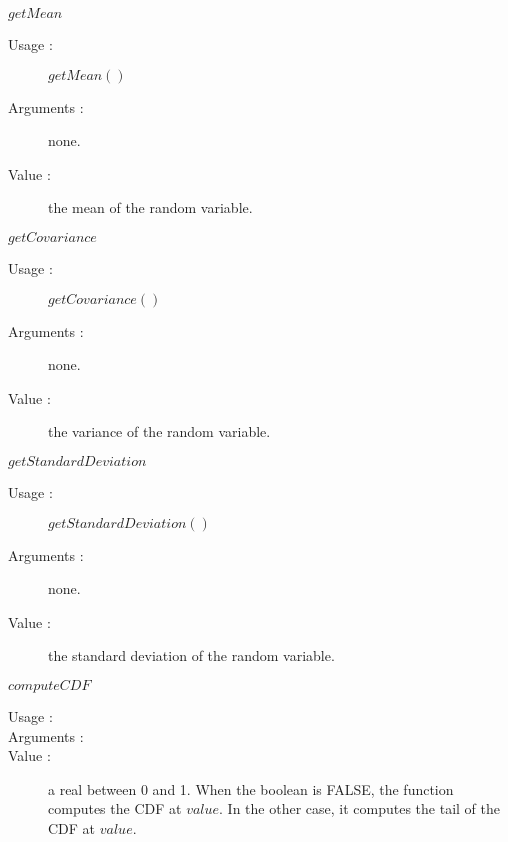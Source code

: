 \begin{description}
\begin{description}
  \item $getMean$
    \begin{description}
    \item[Usage :] $getMean()$
    \item[Arguments :]  none.
    \item[Value :]  the mean of the random variable.
    \end{description}
    \bigskip


  \item $getCovariance$
    \begin{description}
    \item[Usage :] $getCovariance()$
    \item[Arguments :]  none.
    \item[Value :]  the variance of the random variable.
    \end{description}
    \bigskip


  \item $getStandardDeviation$
    \begin{description}
    \item[Usage :] $getStandardDeviation()$
    \item[Arguments :]  none.
    \item[Value :]  the standard deviation of the random variable.
    \end{description}
    \bigskip
 

  \item $computeCDF$
    \begin{description}
    \item[Usage :] \strut
    \item[Arguments :] 
    \item[Value :]  a real between 0 and 1. When the boolean is FALSE, the function computes the CDF at $value$. In the other case, it computes the tail of the CDF at $value$.
    \end{description}
    \bigskip



\end{description}
\end{description}
